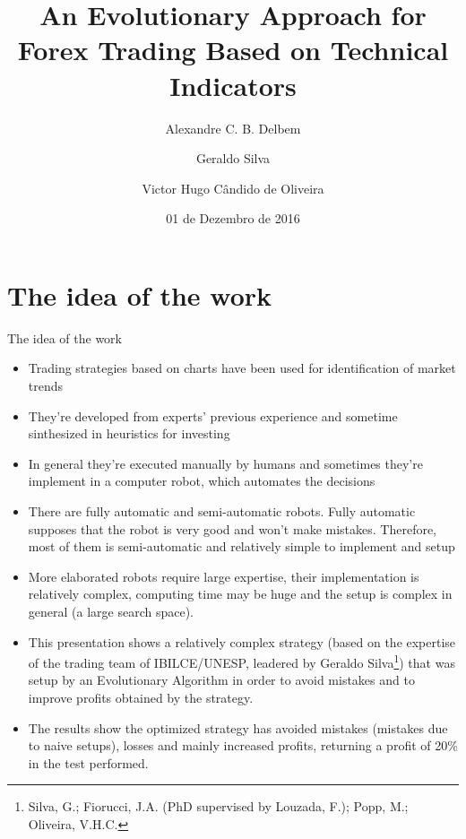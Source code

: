 \documentclass[12pt,portuguese]{beamer}
\title{An Evolutionary Approach for Forex Trading Based on Technical Indicators}
\author[Delbem, A. C. B.]{Alexandre C. B. Delbem \inst{1} \\
	\and Geraldo Silva \inst{2} \\
	\and Victor Hugo Cândido de Oliveira \inst{1}}
\institute[ICMC/USP]{\inst{1} ICMC/USP \and %
                      \inst{2} IBILCE/UNESP}
\date{01 de Dezembro de 2016}
\begin{document}



\maketitle


\section{The idea of the work}
\begin{frame}[allowframebreaks]{The idea of the work}
\begin{itemize}
		\small
	\item Trading strategies based on charts have been used for identification of market trends
	\item They're developed from experts' previous experience and sometime sinthesized in heuristics for investing
	\item In general they're executed manually by humans and sometimes they're implement in a computer robot, which automates the decisions
	\item There are fully automatic and semi-automatic robots. Fully automatic supposes that the robot is very good and won't make mistakes. Therefore, most of them is semi-automatic and relatively simple to implement and setup
	\item More elaborated robots require large expertise, their implementation is relatively complex, computing time may be huge and the setup is complex in general (a large search space).
	\item This presentation shows a relatively complex strategy (based on the expertise of the trading team of IBILCE/UNESP, leadered by Geraldo Silva\footnote{Silva, G.; Fiorucci, J.A. (PhD supervised by Louzada, F.); Popp, M.; Oliveira, V.H.C.}) that was setup by an Evolutionary Algorithm in order to avoid mistakes and to improve profits obtained by the strategy.
	\item The results show the optimized strategy has avoided mistakes (mistakes due to naive setups), losses and mainly increased profits, returning a profit of 20\% in the test performed.
\end{itemize}
\end{frame}
\end{document}
